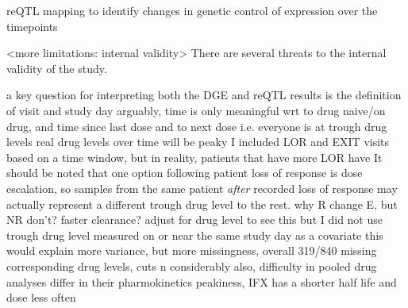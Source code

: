 \begin{outline}


\1 reQTL mapping to identify changes in genetic control of expression over the timepoints

\1 <more limitations: internal validity>
There are several threats to the internal validity of the study.

    \2 a key question for interpreting both the DGE and reQTL results is the definition of visit and study day
        \3 arguably, time is only meaningful wrt to drug naive/on drug, and time since last dose and to next dose i.e. everyone is at trough drug levels
        \3 real drug levels over time will be peaky %
        \3 I included LOR and EXIT visits based on a time window, but in reality, patients that have more LOR have 
        \3 It should be noted that one option following patient loss of response is dose escalation, so samples from the same patient \emph{after} recorded loss of response may actually represent a different trough drug level to the rest.
    \2    %
        \3 why R change E, but NR don't? faster clearance? adjust for drug level to see this
        \3 but I did not use trough drug level measured on or near the same study day as a covariate
        \3 this would explain more variance, but
            more missingness, overall 319/840 missing corresponding drug levels, cuts n considerably
        \3 also, difficulty in pooled drug analyses
        \3 differ in their pharmokinetics peakiness, IFX has a shorter half life and dose less often \autocite{lichtenstein2013ComprehensiveReviewAntitumor}


\end{outline}
